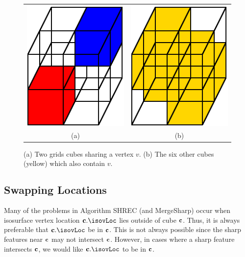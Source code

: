 \begin{figure}[t]
\centering

\begin{tabular}{cc}
\includegraphics[width=0.4\linewidth]{images/shared_vertex.eps} \qquad &
\qquad
\includegraphics[width=0.4\linewidth]{images/shared_vertex_B.eps} \\
(a) & (b)
\end{tabular}

\caption{(a) Two grids cubes sharing a vertex $v$.
(b) The six other cubes (yellow) which also contain $v$.
}
\label{fig:shared_vertex}
\end{figure}

\subsection{Swapping Locations}

Many of the problems in Algorithm SHREC (and MergeSharp) occur when
isosurface vertex location $\cb.\isovLoc$ lies outside of cube $\mathbf{c}$.
Thus, it is always preferable that $\cb.\isovLoc$ be in $\mathbf{c}$.
This is not always possible since the sharp features near $\mathbf{c}$
may not intersect $\mathbf{c}$.
However, in cases where a sharp feature intersects $\mathbf{c}$,
we would like $\cb.\isovLoc$ to be in $\mathbf{c}$.

